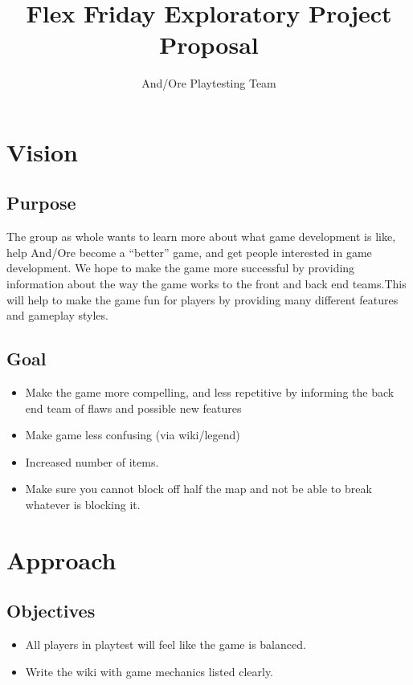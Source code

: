 \documentclass[11pt]{article}
\title{\textbf{{\color{blue}Flex Friday Exploratory Project Proposal}}}
\author{And/Ore Playtesting Team}
\date{}
\begin{document}
\maketitle

\section{{\color{blue}Vision}}

\subsection{{\color{blue}Purpose}}

The group as whole wants to learn more about what game development is like, help And/Ore become a “better” game, and get people interested in game development.  We hope to make the game more  successful by providing information about the way the game works to the front and back end teams.This will help to make the game fun for players by providing many different features and gameplay styles.


\subsection{{\color{blue}Goal}}

\begin{itemize}
\item Make the game more compelling, and less repetitive by informing the back end team of flaws and possible new features
\item Make game less confusing (via wiki/legend)
\item Increased number of items.
\item Make sure you cannot block off half the map and not be able to break whatever is blocking it.
\end{itemize}

\section{{\color{blue}Approach}}


\subsection{{\color{blue}Objectives}}

\begin{itemize}
	\item All players in playtest will feel like the game is balanced.
	\item Write the wiki with game mechanics listed clearly.
\end{itemize}
\end{document}
